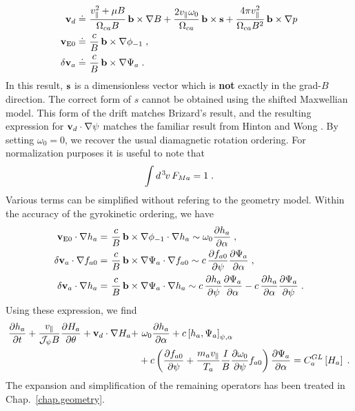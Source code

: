 %
\begin{align}
\mathbf{v}_d \doteq &~\frac{v_\parallel^2+\mu B}{\Omega_{ca} B} \, \mathbf{b} \times\nabla B
+ \frac{2 v_\parallel \omega_0}{\Omega_{ca}} \, \mathbf{b} \times \mathbf{s} 
 + \frac{4\pi v_\parallel^2}{\Omega_{ca} B^2} \, \mathbf{b} \times \nabla p \\
{\bf v}_{\rm E0} \doteq &~\frac{c}{B} \, \mathbf{b}\times\nabla\phi_{-1}\; , \\
\delta {\bf v}_a \doteq &~\frac{c}{B} \, \mathbf{b}\times\nabla\Psi_a \; .
\end{align}
%
In this result, $\mathbf{s}$ is a dimensionless vector which is 
{\bf not} exactly in the grad-$B$ direction.
The correct form of $s$ cannot be obtained using the shifted 
Maxwellian model.   This form of the drift matches Brizard's
result, and the resulting expression for $\mathbf{v}_d \cdot \nabla\psi$ 
matches the familiar result from Hinton and Wong \cite{hinton:1985}.  
By setting $\omega_0=0$, we recover the usual diamagnetic 
rotation ordering.  For normalization purposes it is useful to note that
%
\begin{equation}
\int d^{\hskip 1pt 3} \hskip -1pt v \, F_{Ma} = 1 \; .
\end{equation}
%
Various terms can be simplified without refering to the geometry 
model.  Within the accuracy of the gyrokinetic ordering, we have
%
\begin{align}
{\bf v}_{\rm E0}\cdot\nabla h_a = &~\frac{c}{B} \, \mathbf{b}\times\nabla\phi_{-1} 
 \cdot\nabla h_a 
 \sim \omega_0 \frac{\partial h_a}{\partial\alpha} \; , 
   \label{eq.vedotgradh} \\
\delta {\bf v}_a\cdot\nabla f_{a0} = &~\frac{c}{B} \, \mathbf{b}\times\nabla\Psi_a
 \cdot\nabla f_{a0} \sim c\, \frac{\partial f_{a0}}{\partial\psi}
 \frac{\partial\Psi_a}{\partial\alpha} \; ,
   \label{eq.dvdotgradf} \\
\delta {\bf v}_a\cdot\nabla h_a = &~\frac{c}{B} \, \mathbf{b}\times\nabla\Psi_a
 \cdot\nabla h_a \sim
 c\,\frac{\partial h_a}{\partial\psi}
 \frac{\partial\Psi_a}{\partial\alpha}-
 c\,\frac{\partial h_a}{\partial\alpha}
 \frac{\partial\Psi_a}{\partial\psi} \; .
   \label{eq.dvdotgradh}  
\end{align}
%
Using these expression, we find
\begin{align}
\frac{\partial h_a}{\partial t} 
+ \frac{v_\parallel}{\mathcal{J_\psi} B} \frac{\partial H_a}{\partial\theta}
+ \mathbf{v}_d \cdot\nabla H_a + &~\omega_0 \frac{\partial h_a}{\partial\alpha} 
+ c \left[ h_a,\Psi_a \right]_{\psi,\alpha} \nonumber \\
& + c \left( \frac{\partial f_{a0}}{\partial\psi} + \frac{m_a v_\parallel}{T_a} \frac{I}{B} 
\frac{\partial\omega_0}{\partial\psi} f_{a0} \right) \frac{\partial\Psi_a}{\partial\alpha} 
= C_a^{GL}\left[ H_a \right] \; .
\label{eq.gk}
\end{align}
%
The expansion and simplification of the remaining operators has been 
treated in Chap.~\ref{chap.geometry}.

